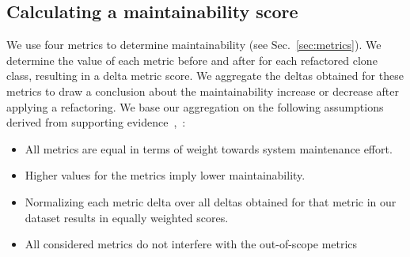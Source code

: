\documentclass[a4paper,UKenglish,cleveref, autoref, thm-restate,authorcolumns]{lipics-v2019}
\begin{document}


\subsection{Calculating a maintainability score}\label{sec:metricformula}
We use four metrics to determine maintainability (see Sec.~\ref{sec:metrics}). We determine the value of each metric before and after for each refactored clone class, resulting in a delta metric score. We aggregate the deltas obtained for these metrics to draw a conclusion about the maintainability increase or decrease after applying a refactoring. We base our aggregation on the following assumptions derived from supporting evidence~\cite{heitlager2007practical},~\cite{alves2010deriving}:
\begin{itemize}
  \item All metrics are equal in terms of weight towards system maintenance effort.
  \item Higher values for the metrics imply lower maintainability.
  \item Normalizing each metric delta over all deltas obtained for that metric in our dataset results in equally weighted
  scores.%
  \item All considered metrics do not interfere with the out-of-scope metrics
\end{itemize}
\end{document}
